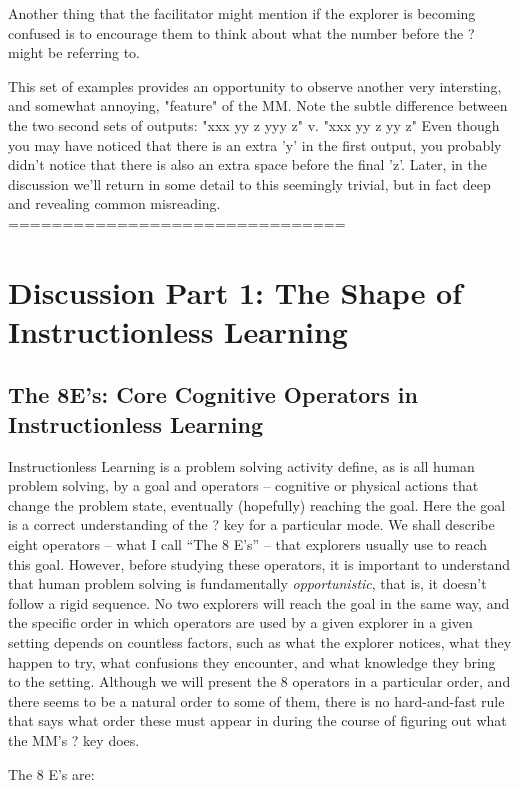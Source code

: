 \documentclass[12pt,letterpaper]{article}
\begin{document}
Another thing that the facilitator might mention if the explorer is becoming confused is to encourage them to think about what the number before the ? might be referring to. 

This set of examples provides an opportunity to observe another very intersting, and somewhat annoying, "feature" of the MM. Note the subtle difference between the two second sets of outputs: "xxx   yy  z yyy   z" v. "xxx   yy  z yy  z" Even though you may have noticed that there is an extra 'y' in the first output, you probably didn't notice that there is also an extra space before the final 'z'. Later, in the discussion we'll return in some detail to this seemingly trivial, but in fact deep and revealing common misreading. 
===============================
\section{Discussion Part 1: The Shape of Instructionless Learning}

\subsection{The 8E's: Core Cognitive Operators in Instructionless Learning}

Instructionless Learning is a problem solving activity define, as is all human problem solving, by a goal and operators -- cognitive or physical actions that change the problem state, eventually (hopefully) reaching the goal\cite{simon_newell1972_human_problem_solving}. Here the goal is a correct understanding of the ? key for a particular mode. We shall describe eight operators -- what I call ``The 8 E's'' -- that explorers usually use to reach this goal. However, before studying these operators, it is important to understand that human problem solving is fundamentally \textit{opportunistic}, that is, it doesn't follow a rigid sequence. No two explorers will reach the goal in the same way, and the specific order in which operators are used by a given explorer in a given setting depends on countless factors, such as what the explorer notices, what they happen to try, what confusions they encounter, and what knowledge they bring to the setting. Although we will present the 8 operators in a particular order, and there seems to be a natural order to some of them, there is no hard-and-fast rule that says what order these must appear in during the course of figuring out what the  MM's ? key does.

The 8 E's are:
\end{document}

